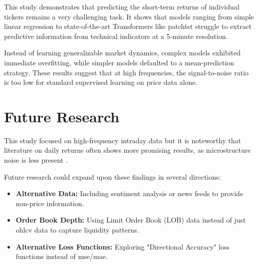 \documentclass[12pt,twoside=false,a4paper,parskip]{scrbook}
\begin{document}
This study demonstrates that predicting the short-term returns of individual tickers remains a very challenging task. It shows that models ranging from simple linear regression to state-of-the-art Transformers like \gls{patchtst} struggle to extract predictive information from technical indicators at a 5-minute resolution.

Instead of learning generalizable market dynamics, complex models exhibited immediate overfitting, while simpler models defaulted to a mean-prediction strategy. These results suggest that at high frequencies, the signal-to-noise ratio is too low for standard supervised learning on price data alone.

\section{Future Research}

This study focused on high-frequency intraday data but it is noteworthy that literature on daily returns often shows more promising results, as microstructure noise is less present \cite{Kim2025Survey}.

Future research could expand upon these findings in several directions:

\begin{itemize}
\item \textbf{Alternative Data:} Including sentiment analysis or news feeds to provide non-price information.
\item \textbf{Order Book Depth:} Using Limit Order Book (LOB) data instead of just \gls{ohlcv} data to capture liquidity patterns.
\item \textbf{Alternative Loss Functions:} Exploring "Directional Accuracy" loss functions instead of \gls{mse}/\gls{mae}.
\end{itemize}

\newpage



\backmatter





\appendix
{}

\end{document}
